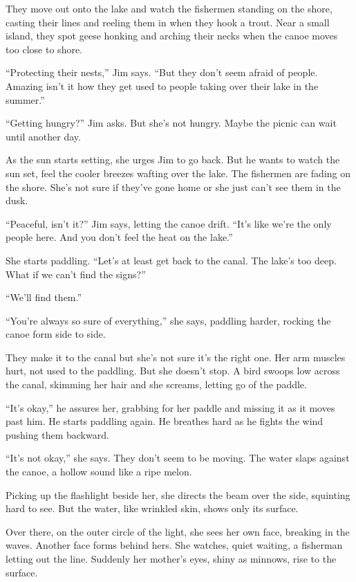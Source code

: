 \documentclass[
]{article}
\begin{document}
They move out onto the lake and watch the fishermen standing on the
shore, casting their lines and reeling them in when they hook a trout.
Near a small island, they spot geese honking and arching their necks
when the canoe moves too close to shore.

``Protecting their nests,'' Jim says. ``But they don't seem afraid of
people. Amazing isn't it how they get used to people taking over their
lake in the summer.''

``Getting hungry?'' Jim asks. But she's not hungry. Maybe the picnic can
wait until another day.

As the sun starts setting, she urges Jim to go back. But he wants to
watch the sun set, feel the cooler breezes wafting over the lake. The
fishermen are fading on the shore. She's not sure if they've gone home
or she just can't see them in the dusk.

``Peaceful, isn't it?'' Jim says, letting the canoe drift. ``It's like
we're the only people here. And you don't feel the heat on the lake.''

She starts paddling. ``Let's at least get back to the canal. The lake's
too deep. What if we can't find the signs?''

``We'll find them.''

``You're always so sure of everything,'' she says, paddling harder,
rocking the canoe form side to side.

They make it to the canal but she's not sure it's the right one. Her arm
muscles hurt, not used to the paddling. But she doesn't stop. A bird
swoops low across the canal, skimming her hair and she screams, letting
go of the paddle.

``It's okay,'' he assures her, grabbing for her paddle and missing it as
it moves past him. He starts paddling again. He breathes hard as he
fights the wind pushing them backward.

``It's not okay,'' she says. They don't seem to be moving. The water
slaps against the canoe, a hollow sound like a ripe melon.

Picking up the flashlight beside her, she directs the beam over the
side, squinting hard to see. But the water, like wrinkled skin, shows
only its surface.

Over there, on the outer circle of the light, she sees her own face,
breaking in the waves. Another face forms behind hers. She watches,
quiet waiting, a fisherman letting out the line. Suddenly her mother's
eyes, shiny as minnows, rise to the surface.
\end{document}
